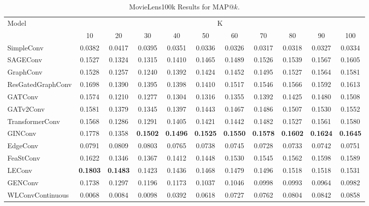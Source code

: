\documentclass{scrartcl}
\begin{document}
\begin{appendices}
\begin{table}[htbp]
    \hspace{-2.3cm}
    \begin{tabular}{|l|*{10}{c|}}
    \hline
    \multirow{2}{*}{Model} & \multicolumn{10}{c|}{K} \\
    \hhline{~*{10}{|-}|}
                             & 10    & 20    & 30    & 40    & 50    & 60    & 70    & 80    & 90    & 100   \\ \hline
    \rowcolor[gray]{0.9} SimpleConv               & 0.0382 & 0.0417 & 0.0395 & 0.0351 & 0.0336 & 0.0326 & 0.0317 & 0.0318 & 0.0327 & 0.0334 \\ 
    SAGEConv                 & 0.1527 & 0.1324 & 0.1315 & 0.1410 & 0.1465 & 0.1489 & 0.1526 & 0.1539 & 0.1567 & 0.1605 \\ 
    \rowcolor[gray]{0.9} GraphConv                & 0.1528 & 0.1257 & 0.1240 & 0.1392 & 0.1424 & 0.1452 & 0.1495 & 0.1527 & 0.1564 & 0.1581 \\ 
    ResGatedGraphConv        & 0.1698 & 0.1390 & 0.1395 & 0.1398 & 0.1410 & 0.1517 & 0.1546 & 0.1566 & 0.1592 & 0.1613 \\ 
    \rowcolor[gray]{0.9} GATConv                  & 0.1574 & 0.1210 & 0.1277 & 0.1304 & 0.1316 & 0.1355 & 0.1392 & 0.1425 & 0.1480 & 0.1508 \\ 
    GATv2Conv                & 0.1581 & 0.1379 & 0.1345 & 0.1397 & 0.1443 & 0.1467 & 0.1486 & 0.1507 & 0.1530 & 0.1552 \\ 
    \rowcolor[gray]{0.9} TransformerConv          & 0.1568 & 0.1286 & 0.1291 & 0.1405 & 0.1421 & 0.1442 & 0.1482 & 0.1527 & 0.1561 & 0.1580 \\ 
    GINConv                  & 0.1778 & 0.1358 & \textbf{0.1502} & \textbf{0.1496} & \textbf{0.1525} & \textbf{0.1550} & \textbf{0.1578} & \textbf{0.1602} & \textbf{0.1624} & \textbf{0.1645} \\ 
    \rowcolor[gray]{0.9} EdgeConv                 & 0.0791 & 0.0809 & 0.0803 & 0.0765 & 0.0738 & 0.0745 & 0.0728 & 0.0733 & 0.0742 & 0.0751 \\ 
    FeaStConv                & 0.1622 & 0.1346 & 0.1367 & 0.1412 & 0.1448 & 0.1530 & 0.1545 & 0.1562 & 0.1598 & 0.1589 \\ 
    \rowcolor[gray]{0.9} LEConv                   & \textbf{0.1803} & \textbf{0.1483} & 0.1423 & 0.1436 & 0.1468 & 0.1479 & 0.1496 & 0.1518 & 0.1518 & 0.1531 \\ 
    GENConv                  & 0.1738 & 0.1297 & 0.1196 & 0.1173 & 0.1037 & 0.1046 & 0.0998 & 0.0993 & 0.0964 & 0.0982 \\ 
    \rowcolor[gray]{0.9} WLConvContinuous         & 0.0068 & 0.0084 & 0.0098 & 0.0392 & 0.0618 & 0.0727 & 0.0762 & 0.0804 & 0.0842 & 0.0858 \\ \hline
    \end{tabular}
    \caption{MovieLens100k Results for MAP@$k$.}
    \label{tab:map}
\end{table}


\end{appendices}
\end{document}
